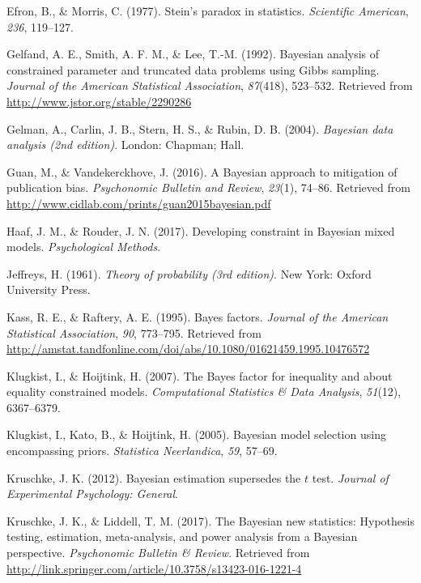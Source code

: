 \documentclass[english,man]{apa6}
\theoremstyle{definition}
\theoremstyle{definition}
\theoremstyle{remark}
\begin{document}
\hypertarget{ref-Efron:Morris:1977}{}
Efron, B., \& Morris, C. (1977). Stein's paradox in statistics.
\emph{Scientific American}, \emph{236}, 119--127.

\hypertarget{ref-Gelfand:etal:1992}{}
Gelfand, A. E., Smith, A. F. M., \& Lee, T.-M. (1992). Bayesian analysis
of constrained parameter and truncated data problems using Gibbs
sampling. \emph{Journal of the American Statistical Association},
\emph{87}(418), 523--532. Retrieved from
\url{http://www.jstor.org/stable/2290286}

\hypertarget{ref-Gelman:etal:2004}{}
Gelman, A., Carlin, J. B., Stern, H. S., \& Rubin, D. B. (2004).
\emph{Bayesian data analysis (2nd edition)}. London: Chapman; Hall.

\hypertarget{ref-Guan:Vandekerckhove:2016}{}
Guan, M., \& Vandekerckhove, J. (2016). A Bayesian approach to
mitigation of publication bias. \emph{Psychonomic Bulletin and Review},
\emph{23}(1), 74--86. Retrieved from
\url{http://www.cidlab.com/prints/guan2015bayesian.pdf}

\hypertarget{ref-Haaf:Rouder:2017}{}
Haaf, J. M., \& Rouder, J. N. (2017). Developing constraint in Bayesian
mixed models. \emph{Psychological Methods}.

\hypertarget{ref-Jeffreys:1961}{}
Jeffreys, H. (1961). \emph{Theory of probability (3rd edition)}. New
York: Oxford University Press.

\hypertarget{ref-Kass:Raftery:1995}{}
Kass, R. E., \& Raftery, A. E. (1995). Bayes factors. \emph{Journal of
the American Statistical Association}, \emph{90}, 773--795. Retrieved
from
\url{http://amstat.tandfonline.com/doi/abs/10.1080/01621459.1995.10476572}

\hypertarget{ref-Klugkist:Hoijtink:2007}{}
Klugkist, I., \& Hoijtink, H. (2007). The Bayes factor for inequality
and about equality constrained models. \emph{Computational Statistics \&
Data Analysis}, \emph{51}(12), 6367--6379.

\hypertarget{ref-Klugkist:etal:2005}{}
Klugkist, I., Kato, B., \& Hoijtink, H. (2005). Bayesian model selection
using encompassing priors. \emph{Statistica Neerlandica}, \emph{59},
57--69.

\hypertarget{ref-Kruschke:2012}{}
Kruschke, J. K. (2012). Bayesian estimation supersedes the \(t\) test.
\emph{Journal of Experimental Psychology: General}.

\hypertarget{ref-Kruschke:Liddell:2017}{}
Kruschke, J. K., \& Liddell, T. M. (2017). The Bayesian new statistics:
Hypothesis testing, estimation, meta-analysis, and power analysis from a
Bayesian perspective. \emph{Psychonomic Bulletin \& Review}. Retrieved
from \url{http://link.springer.com/article/10.3758/s13423-016-1221-4}
\end{document}
